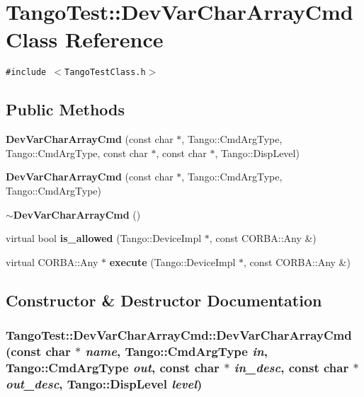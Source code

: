 \section{Tango\-Test::Dev\-Var\-Char\-Array\-Cmd  Class Reference}
\label{classTangoTest_1_1DevVarCharArrayCmd}
{\tt \#include $<$Tango\-Test\-Class.h$>$}

\subsection*{Public Methods}
\begin{CompactItemize}
\item 
{\bf Dev\-Var\-Char\-Array\-Cmd} (const char $\ast$, Tango::Cmd\-Arg\-Type, Tango::Cmd\-Arg\-Type, const char $\ast$, const char $\ast$, Tango::Disp\-Level)
\item 
{\bf Dev\-Var\-Char\-Array\-Cmd} (const char $\ast$, Tango::Cmd\-Arg\-Type, Tango::Cmd\-Arg\-Type)
\item 
{\bf $\sim$Dev\-Var\-Char\-Array\-Cmd} ()
\item 
virtual bool {\bf is\_\-allowed} (Tango::Device\-Impl $\ast$, const CORBA::Any \&)
\item 
virtual CORBA::Any $\ast$ {\bf execute} (Tango::Device\-Impl $\ast$, const CORBA::Any \&)
\end{CompactItemize}


\subsection{Constructor \& Destructor Documentation}
\subsubsection{\setlength{\rightskip}{0pt plus 5cm}Tango\-Test::Dev\-Var\-Char\-Array\-Cmd::Dev\-Var\-Char\-Array\-Cmd (const char $\ast$ {\em name}, Tango::Cmd\-Arg\-Type {\em in}, Tango::Cmd\-Arg\-Type {\em out}, const char $\ast$ {\em in\_\-desc}, const char $\ast$ {\em out\_\-desc}, Tango::Disp\-Level {\em level})}\label{classTangoTest_1_1DevVarCharArrayCmd_a0}


